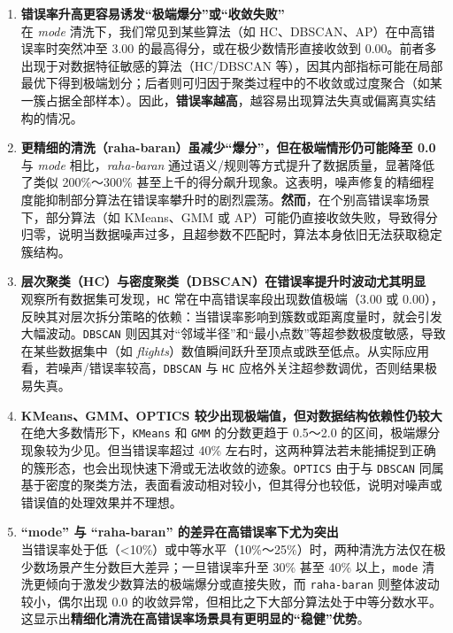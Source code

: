 \documentclass[10pt]{article} %
\numberwithin{equation}{section}
\begin{document}
\begin{enumerate}
    \item \textbf{错误率升高更容易诱发“极端爆分”或“收敛失败”} \\
    在 \textit{mode} 清洗下，我们常见到某些算法（如 HC、DBSCAN、AP）在中高错误率时突然冲至 3.00 的最高得分，或在极少数情形直接收敛到 0.00。前者多出现于对数据特征敏感的算法（HC/DBSCAN 等），因其内部指标可能在局部最优下得到极端划分；后者则可归因于聚类过程中的不收敛或过度聚合（如某一簇占据全部样本）。因此，\textbf{错误率越高}，越容易出现算法失真或偏离真实结构的情况。

    \item \textbf{更精细的清洗（raha-baran）虽减少“爆分”，但在极端情形仍可能降至 0.0} \\
    与 \textit{mode} 相比，\textit{raha-baran} 通过语义/规则等方式提升了数据质量，显著降低了类似 200\%～300\% 甚至上千的得分飙升现象。这表明，噪声修复的精细程度能抑制部分算法在错误率攀升时的剧烈震荡。\textbf{然而}，在个别高错误率场景下，部分算法（如 KMeans、GMM 或 AP）可能仍直接收敛失败，导致得分归零，说明当数据噪声过多，且超参数不匹配时，算法本身依旧无法获取稳定簇结构。

    \item \textbf{层次聚类（HC）与密度聚类（DBSCAN）在错误率提升时波动尤其明显} \\
    观察所有数据集可发现，\texttt{HC} 常在中高错误率段出现数值极端（3.00 或 0.00），反映其对层次拆分策略的依赖：当错误率影响到簇数或距离度量时，就会引发大幅波动。\texttt{DBSCAN} 则因其对“邻域半径”和“最小点数”等超参数极度敏感，导致在某些数据集中（如 \textit{flights}）数值瞬间跃升至顶点或跌至低点。从实际应用看，若噪声/错误率较高，\texttt{DBSCAN} 与 \texttt{HC} 应格外关注超参数调优，否则结果极易失真。

    \item \textbf{KMeans、GMM、OPTICS 较少出现极端值，但对数据结构依赖性仍较大} \\
    在绝大多数情形下，\texttt{KMeans} 和 \texttt{GMM} 的分数更趋于 0.5～2.0 的区间，极端爆分现象较为少见。但当错误率超过 40\% 左右时，这两种算法若未能捕捉到正确的簇形态，也会出现快速下滑或无法收敛的迹象。\texttt{OPTICS} 由于与 \texttt{DBSCAN} 同属基于密度的聚类方法，表面看波动相对较小，但其得分也较低，说明对噪声或错误值的处理效果并不理想。

    \item \textbf{“mode” 与 “raha-baran” 的差异在高错误率下尤为突出} \\
    当错误率处于低（\textless 10\%）或中等水平（10\%～25\%）时，两种清洗方法仅在极少数场景产生分数巨大差异；一旦错误率升至 30\% 甚至 40\% 以上，\texttt{mode} 清洗更倾向于激发少数算法的极端爆分或直接失败，而 \texttt{raha-baran} 则整体波动较小，偶尔出现 0.0 的收敛异常，但相比之下大部分算法处于中等分数水平。这显示出\textbf{精细化清洗在高错误率场景具有更明显的“稳健”优势}。
\end{enumerate}
\end{document}
